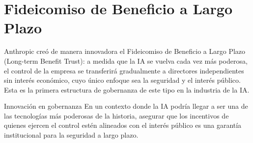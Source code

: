 \section{Fideicomiso de Beneficio a Largo Plazo}

Anthropic creó de manera innovadora el Fideicomiso de Beneficio a Largo Plazo (Long-term Benefit Trust): a medida que la IA se vuelva cada vez más poderosa, el control de la empresa se transferirá gradualmente a directores independientes sin interés económico, cuyo único enfoque sea la seguridad y el interés público. Esta es la primera estructura de gobernanza de este tipo en la industria de la IA.

\begin{importantbox}{Innovación en gobernanza}
En un contexto donde la IA podría llegar a ser una de las tecnologías más poderosas de la historia, asegurar que los incentivos de quienes ejercen el control estén alineados con el interés público es una garantía institucional para la seguridad a largo plazo.
\end{importantbox}

